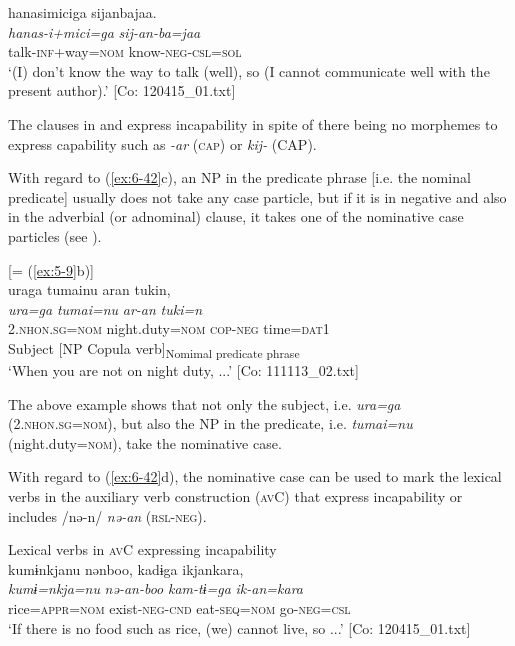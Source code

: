 \ex
{\TM}
\glll hanasimiciga  sijanbajaa.\\
\textit{hanas-i+mici=ga}  \textit{sij-an-ba=jaa}\\
talk-\textsc{inf}+way=\textsc{nom}  know-\textsc{neg}-\textsc{csl}=\textsc{sol}\\
\glt ‘(I) don’t know the way to talk (well), so (I cannot communicate well with the present author).’ [Co: 120415\_01.txt]
\z
\z

The clauses in  and  express incapability in spite of there being no morphemes to express capability such as \textit{-ar} (\textsc{cap}) or \textit{kij-} (CAP).

  With regard to (\ref{ex:6-42}c), an NP in the predicate phrase [i.e. the nominal predicate] usually does not take any case particle, but if it is in negative and also in the adverbial (or adnominal) clause, it takes one of the nominative case particles (see ).

\ea\label{ex:6-47}
 [= (\ref{ex:5-9}b)]\\
{\TM}
\gllll uraga  tumainu  aran  tukin,\\
\textit{ura=ga}  \textit{tumai=nu}  \textit{ar-an}  \textit{tuki=n}\\
    2.\textsc{nhon}.\textsc{sg}=\textsc{nom}  night.duty=\textsc{nom}  \textsc{cop}-\textsc{neg}  time=\textsc{dat}1\\
    Subject  [NP  Copula verb]\textsubscript{Nomimal predicate phrase}  \\
\glt    ‘When you are not on night duty, ...’ [Co: 111113\_02.txt]
\z

The above example shows that not only the subject, i.e. \textit{ura=ga} (2.\textsc{nhon}.\textsc{sg}=\textsc{nom}), but also the NP in the predicate, i.e. \textit{tumai=nu} (night.duty=\textsc{nom}), take the nominative case.

  With regard to (\ref{ex:6-42}d), the nominative case can be used to mark the lexical verbs in the auxiliary verb construction (\textsc{av}C) that express incapability or includes /nə-n/ \textit{nə-an} (\textsc{rsl}-\textsc{neg}).

\ea\label{ex:6-48}
 Lexical verbs in \textsc{av}C expressing incapability\\

 \ea
 {\TM}
\glll kumɨnkjanu  nənboo,  kadɨga  ikjankara,\\
\textit{kumɨ=nkja=nu}  \textit{nə-an-boo}  \textit{kam-tɨ=ga}  \textit{ik-an=kara}\\
rice=\textsc{appr}=\textsc{nom}  exist-\textsc{neg}-\textsc{cnd}  eat-\textsc{seq}=\textsc{nom}  go-\textsc{neg}=\textsc{csl}\\
\glt ‘If there is no food such as rice, (we) cannot live, so ...’ [Co: 120415\_01.txt]

